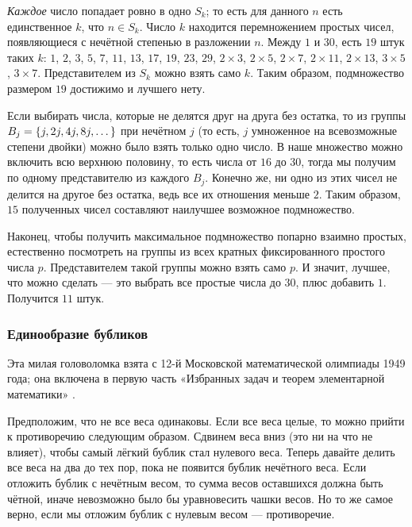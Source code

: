 \emph{Каждое} число попадает ровно в одно $S_k$;
то есть для данного $n$ есть единственное $k$, что $n \in S_k$.
Число $k$ находится перемножением простых чисел, появляющиеся с нечётной степенью в разложении $n$.
Между $1$ и $30$, есть $19$ штук таких $k$: $1$, $2$, $3$, $5$, $7$, $11$, $13$, $17$, $19$,
$23$, $29$, $2 \times 3$, $2 \times 5$, $2 \times 7$, $2 \times 11$, $2 \times 13$, $3 \times 5$, $3 \times 7$.
Представителем из $S_k$ можно взять само $k$.
Таким образом, подмножество размером $19$ достижимо и лучшего нету.

Если выбирать числа, которые не делятся друг на друга без остатка, то из группы $B_j \z= \{j, 2j, 4j, 8j, \dots\}$ при нечётном $j$ (то есть, $j$ умноженное на всевозможные степени двойки) можно было взять только одно число.
В наше множество можно включить всю верхнюю половину, то есть числа от $16$ до $30$, тогда мы получим по одному представителю из каждого $B_j$.
Конечно же, ни одно из этих чисел не делится на другое без остатка, ведь все их отношения меньше $2$.
Таким образом, $15$ полученных чисел составляют наилучшее возможное подмножество.

Наконец, чтобы получить максимальное подмножество попарно взаимно простых, естественно посмотреть на группы из всех кратных фиксированного простого числа $p$.
Представителем такой группы можно взять само $p$. 
И значит, лучшее, что можно сделать — это выбрать все простые числа до $30$, плюс добавить $1$.
Получится $11$ штук.

\subsubsection*{Единообразие бубликов}

Эта милая головоломка взята с 12-й Московской математической олимпиады 1949 года;
она включена в первую часть «Избранных задач и теорем элементарной математики» %
\cite[задача 127, стр. 28]{51}.

Предположим, что не все веса одинаковы.
Если все веса целые, то можно прийти к противоречию следующим образом.
Сдвинем веса вниз (это ни на что не влияет), чтобы самый лёгкий бублик стал нулевого веса.
Теперь давайте делить все веса на два до тех пор, пока не появится бублик нечётного веса.
Если отложить бублик с нечётным весом, то сумма весов оставшихся должна быть чётной, иначе невозможно было бы уравновесить чашки весов.
Но то же самое верно, если мы отложим бублик с нулевым весом --- противоречие.

